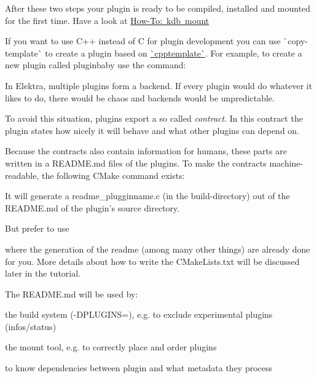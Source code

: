 After these two steps your plugin is ready to be compiled, installed and mounted for the first time. Have a look at \mbox{\hyperlink{doc_tutorials_mount_md}{How-\/\+To\+: kdb mount}}

If you want to use C++ instead of C for plugin development you can use \`{}copy-\/template\`{} to create a plugin based on \mbox{\hyperlink{autotoc_md110_src_plugins_cpptemplate_README_md}{\`{}cpptemplate\`{}}}. For example, to create a new plugin called {\ttfamily pluginbaby} use the command\+:


\begin{DoxyCode}{0}
\end{DoxyCode}


In Elektra, multiple plugins form a backend. If every plugin would do whatever it likes to do, there would be chaos and backends would be unpredictable.

To avoid this situation, plugins export a so called {\itshape contract}. In this contract the plugin states how nicely it will behave and what other plugins can depend on.

Because the contracts also contain information for humans, these parts are written in a {\ttfamily R\+E\+A\+D\+M\+E.\+md} files of the plugins. To make the contracts machine-\/readable, the following C\+Make command exists\+:


\begin{DoxyCode}{0}
\end{DoxyCode}


It will generate a {\ttfamily readme\+\_\+plugginname.\+c} (in the build-\/directory) out of the {\ttfamily R\+E\+A\+D\+M\+E.\+md} of the plugin’s source directory.

But prefer to use


\begin{DoxyCode}{0}
\end{DoxyCode}


where the generation of the readme (among many other things) are already done for you. More details about how to write the {\ttfamily C\+Make\+Lists.\+txt} will be discussed later in the tutorial.

The {\ttfamily R\+E\+A\+D\+M\+E.\+md} will be used by\+:


\begin{DoxyItemize}
\item the build system ({\ttfamily -\/D\+P\+L\+U\+G\+I\+NS=}), e.\+g. to exclude experimental plugins ({\ttfamily infos/status})
\item the mount tool, e.\+g. to correctly place and order plugins
\item to know dependencies between plugin and what metadata they process
\end{DoxyItemize}

